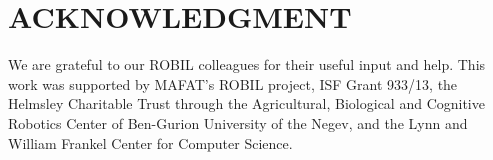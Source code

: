 \documentclass[ 5p, 12pt, times, twocolumn, sort&compress ]{elsarticle}
\begin{document}








\section*{ACKNOWLEDGMENT}
We are grateful to our ROBIL  colleagues for their useful input and help. This work was supported by MAFAT's ROBIL project, ISF Grant 933/13, 
the Helmsley Charitable Trust through the Agricultural, Biological and Cognitive Robotics Center of Ben-Gurion University of the Negev, and the Lynn and William Frankel Center for Computer Science.



   

\end{document}

